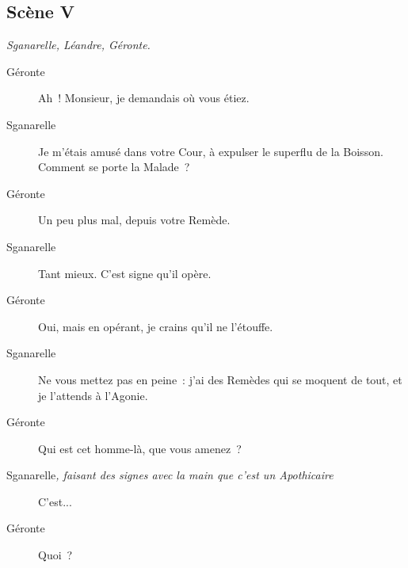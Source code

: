 \documentclass[french,twoside]{book} %
\begin{document}
\subsection[{Scène V}]{Scène V}
\label{III05}
\textit{Sganarelle, Léandre, Géronte.}\par
 \begin{description} \item[Géronte] 

Ah ! Monsieur, je demandais où vous étiez.\end{description}
 \begin{description} \item[Sganarelle] 

Je m’étais amusé dans votre Cour, à expulser le superflu de la Boisson. Comment se porte la Malade ?\end{description}
 \begin{description} \item[Géronte] 

Un peu plus mal, depuis votre Remède.\end{description}
 \begin{description} \item[Sganarelle] 

Tant mieux. C’est signe qu’il opère.\end{description}
 \begin{description} \item[Géronte] 

Oui, mais en opérant, je crains qu’il ne l’étouffe.\end{description}
 \begin{description} \item[Sganarelle] 

Ne vous mettez pas en peine : j’ai des Remèdes qui se moquent de tout, et je l’attends à l’Agonie.\end{description}
 \begin{description} \item[Géronte] 

Qui est cet homme-là, que vous amenez ?\end{description}
 \begin{description} \item[Sganarelle\textit{, faisant des signes avec la main que c’est un Apothicaire}\par
] 

C’est...\end{description}
 \begin{description} \item[Géronte] 

Quoi ?\end{description}
\end{document}
